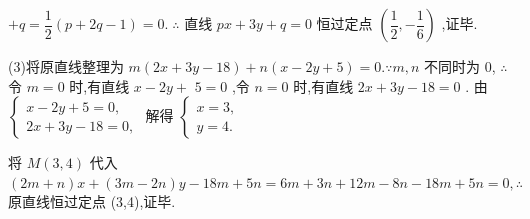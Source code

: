 $+ q = \dfrac{1}{2}\left( {p + {2q} - 1}\right)  = 0.\;\therefore$ 直线 ${px} + {3y} + q = 0$ 恒过定点 $\left( {\dfrac{1}{2}, - \dfrac{1}{6}}\right)$ ,证毕.

(3)将原直线整理为 $m\left( {{2x} + {3y} - {18}}\right)  + n\left( {x - {2y} + 5}\right)  = 0.\because m,n$ 不同时为 0, $\therefore$ 令 $m = 0$ 时,有直线 $x - {2y} +$  $5 = 0$ ,令 $n = 0$ 时,有直线 ${2x} + {3y} - {18} = 0$ . 由 $\left\{  \begin{array}{l} x - {2y} + 5 = 0, \\  {2x} + {3y} - {18} = 0, \end{array}\right.$ 解得 $\left\{  \begin{array}{l} x = 3, \\  y = 4. \end{array}\right.$

将 $M\left( {3,4}\right)$ 代入 $\left( {{2m} + n}\right) x + \left( {{3m} - {2n}}\right) y - {18m} + {5n} = {6m} + {3n} + {12m} - {8n} - {18m} + {5n} = 0,\therefore$ 原直线恒过定点 (3,4),证毕.

